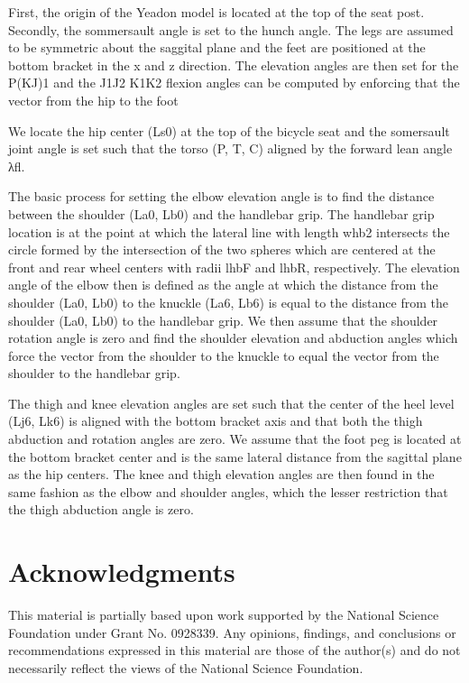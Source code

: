 \documentclass[10pt]{article}
\begin{document}
First, the origin of the Yeadon model is located at the top of the seat post.
Secondly, the sommersault angle is set to the hunch angle. The legs are assumed
to be symmetric about the saggital plane and the feet are positioned at the
bottom bracket in the x and z direction. The elevation angles are then set for
the P(KJ)1 and the J1J2 K1K2 flexion angles can be computed by enforcing that
the vector from the hip to the foot

We locate the hip center (Ls0) at the top of the bicycle seat and the
somersault joint angle is set such that the torso (P, T, C) aligned by the
forward lean angle λfl.

The basic process for setting the elbow elevation angle is to find the distance
between the shoulder (La0, Lb0) and the handlebar grip. The handlebar grip
location is at the point at which the lateral line with length whb2 intersects
the circle formed by the intersection of the two spheres which are centered at
the front and rear wheel centers with radii lhbF and lhbR, respectively. The
elevation angle of the elbow then is defined as the angle at which the distance
from the shoulder (La0, Lb0) to the knuckle (La6, Lb6) is equal to the distance
from the shoulder (La0, Lb0) to the handlebar grip. We then assume that the
shoulder rotation angle is zero and find the shoulder elevation and abduction
angles which force the vector from the shoulder to the knuckle to equal the
vector from the shoulder to the handlebar grip.

The thigh and knee elevation angles are set such that the center of the heel
level (Lj6, Lk6) is aligned with the bottom bracket axis and that both the
thigh abduction and rotation angles are zero. We assume that the foot peg is
located at the bottom bracket center and is the same lateral distance from the
sagittal plane as the hip centers. The knee and thigh elevation angles are then
found in the same fashion as the elbow and shoulder angles, which the lesser
restriction that the thigh abduction angle is zero.

\section*{Acknowledgments}
This material is partially based upon work supported by the National Science
Foundation under Grant No. 0928339. Any opinions, findings, and conclusions or
recommendations expressed in this material are those of the author(s) and do
not necessarily reflect the views of the National Science Foundation.

\end{document}
